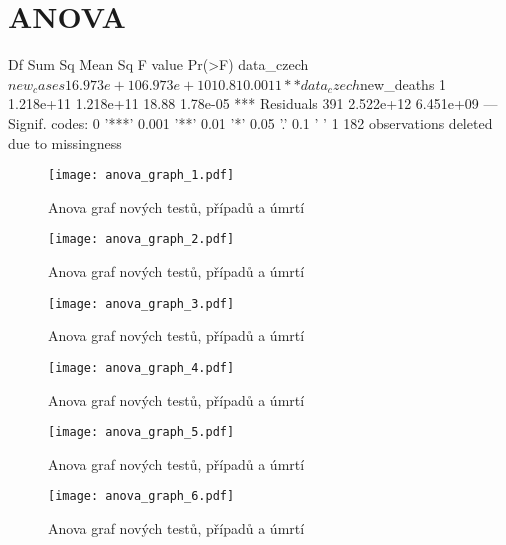 \documentclass[a4paper, 12pt]{article}
\begin{document}
\begin{Schunk}
\end{Schunk}

\section{ANOVA}

\begin{Schunk}
\begin{Soutput}
                       Df    Sum Sq   Mean Sq F value   Pr(>F)    
data_czech$new_cases    1 6.973e+10 6.973e+10   10.81   0.0011 ** 
data_czech$new_deaths   1 1.218e+11 1.218e+11   18.88 1.78e-05 ***
Residuals             391 2.522e+12 6.451e+09                     
---
Signif. codes:  0 '***' 0.001 '**' 0.01 '*' 0.05 '.' 0.1 ' ' 1
182 observations deleted due to missingness
\end{Soutput}
\end{Schunk}

\begin{figure}[H]
\centering

\texttt{[image: anova\_graph\_1.pdf]}
\caption{Anova graf nových testů, případů a úmrtí}

\end{figure}

\begin{figure}[H]
\centering

\texttt{[image: anova\_graph\_2.pdf]}
\caption{Anova graf nových testů, případů a úmrtí}

\texttt{[image: anova\_graph\_3.pdf]}
\caption{Anova graf nových testů, případů a úmrtí}

\end{figure}

\begin{figure}[H]
\centering

\texttt{[image: anova\_graph\_4.pdf]}
\caption{Anova graf nových testů, případů a úmrtí}

\texttt{[image: anova\_graph\_5.pdf]}
\caption{Anova graf nových testů, případů a úmrtí}

\end{figure}

\begin{figure}[H]
\centering

\texttt{[image: anova\_graph\_6.pdf]}
\caption{Anova graf nových testů, případů a úmrtí}

\end{figure}
\end{document}
